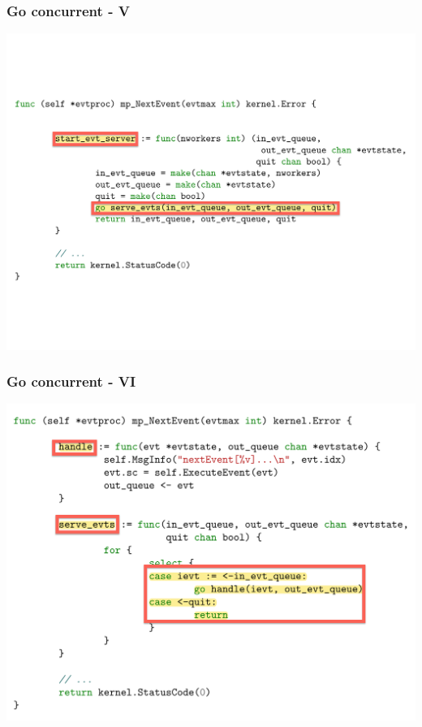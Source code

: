 \documentclass[bigger]{beamer}
\begin{document}
\begin{frame}
\frametitle{Go concurrent - V}
\label{sec-1-14}


\includegraphics[width=.9\linewidth]{figs/evtproc-mp-next-evt-2-go.pdf}
\end{frame}
\begin{frame}
\frametitle{Go concurrent - VI}
\label{sec-1-15}


\includegraphics[width=.9\linewidth]{figs/evtproc-mp-next-evt-3-go.pdf}
\end{frame}
\end{document}

